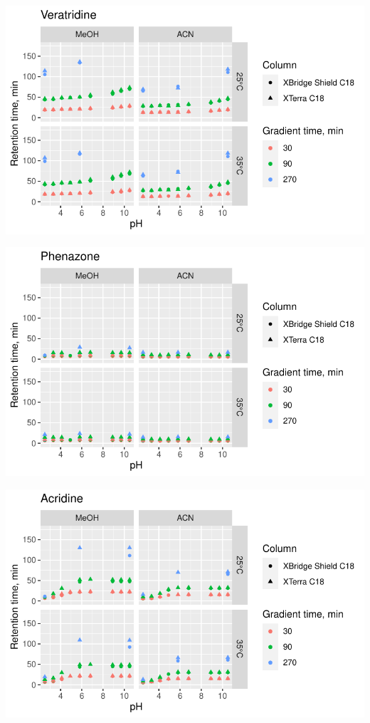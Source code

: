 \documentclass[
  letterpaper,
  DIV=11,
  numbers=noendperiod]{scrreprt}
\begin{document}
\includegraphics{index_files/figure-pdf/unnamed-chunk-4-6.pdf}

\includegraphics{index_files/figure-pdf/unnamed-chunk-4-7.pdf}

\includegraphics{index_files/figure-pdf/unnamed-chunk-4-8.pdf}
\end{document}
